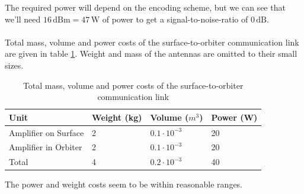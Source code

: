 The required power will depend on the encoding scheme, but we can see that we'll need $16\,\mathrm{dBm}=47\,\mathrm{W}$ of power to get a signal-to-noise-ratio of $0\,\mathrm{dB}$.\\
\\
Total mass, volume and power costs of the surface-to-orbiter communication link are given in table \ref{tab:commsurf}. Weight and mass of the antennas are omitted to their small sizes.
\begin{table}[htb]
\centering

\label{my-label}
\begin{tabular}{|l|l|l|l|}
\hline
\textbf{Unit}        & \textbf{Weight (kg)} & \textbf{Volume ($m^{3}$)} & \textbf{Power (W)} \\ \hline
Amplifier on Surface & 2                    & $0.1\cdot 10^{-3}$        & 20                 \\ \hline
Amplifier in Orbiter & 2                    & $0.1\cdot 10^{-3}$        & 20                 \\ \hline
\hline
Total                & 4                    & $0.2\cdot 10^{-3}$        & 40                 \\ \hline
\end{tabular}
\caption{Total mass, volume and power costs of the surface-to-orbiter communication link}
\label{tab:commsurf}
\end{table}
The power and weight costs seem to be within reasonable ranges. 

